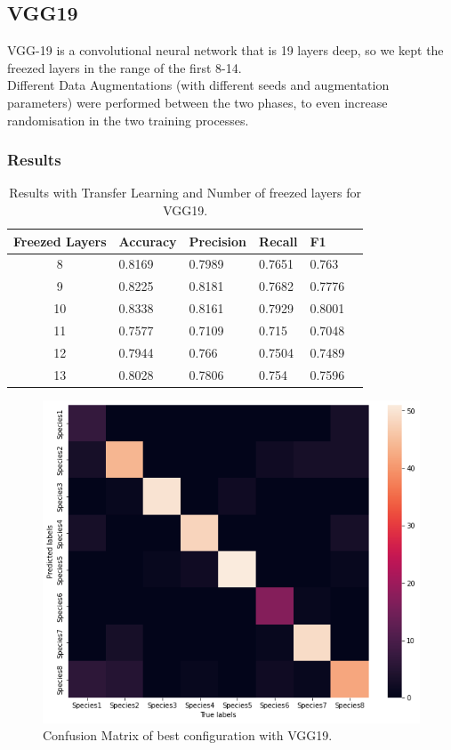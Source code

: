 \documentclass[10pt]{article}
\begin{document}
\subsection{VGG19}
VGG-19 is a convolutional neural network that is 19 layers deep, so we kept the freezed layers in the range of the first 8-14.\\
Different Data Augmentations (with different seeds and augmentation parameters) were performed between the two phases,
to even increase randomisation in the two training processes.
\subsubsection{Results}
\begin{table}[ht]
\centering
\begin{adjustbox}{width=240}
\small
\begin{tabular}{|c|l|l|l|l|l}

\hline \bf Freezed Layers & \bf Accuracy & \bf Precision & \bf Recall & \bf F1 \\ \hline
8 & 0.8169 & 0.7989 & 0.7651 & 0.763\\
9 & 0.8225 & 0.8181 & 0.7682 & 0.7776\\
10 & 0.8338 & 0.8161 & 0.7929 & 0.8001\\
11 & 0.7577 & 0.7109 & 0.715 & 0.7048\\
12 & 0.7944 & 0.766 & 0.7504 & 0.7489\\
13 & 0.8028 & 0.7806 & 0.754 & 0.7596\\
\hline
\end{tabular}
\end{adjustbox}
\caption{Results with Transfer Learning and Number of freezed layers for VGG19.}
\end{table}


\begin{figure}[ht]
\begin{center}
\centerline{\includegraphics[width=\columnwidth]{VGG19_best}}
\caption{Confusion Matrix of best configuration with VGG19.}
\label{bayespic}
\end{center}
\end{figure}
\end{document}
